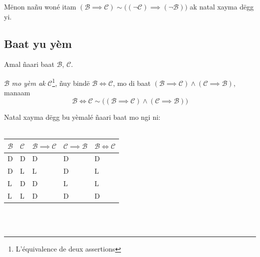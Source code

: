 \documentclass[twoside, a4paper]{article}
\begin{document}
Mënon nañu woné itam
$(\mathcal{B} \implies \mathcal{C}) \sim \big( (\neg\mathcal{C}) \implies (\neg \mathcal{B}) \big)$ ak natal xayma dëgg yi.

\subsection{Baat yu yèm}
\begin{tcolorbox}[enhanced jigsaw,breakable,pad at break*=1mm, colback=red!5!white,colframe=white!75!black,title= Téeki,
    watermark color=white]
  Amal ñaari baat $\mathcal{B}$, $\mathcal{C}$.

  $\mathcal{B}$ \textit{mo yèm ak} $\mathcal{C}$\footnote{L'équivalence de deux assertions}, ñuy bindë $\mathcal{B}\iff \mathcal{C} $, mo di baat $(\mathcal{B}\implies \mathcal{C}) \land (\mathcal{C}\implies \mathcal{B})$, manaam $$\mathcal{B}\iff \mathcal{C} \sim \big( (\mathcal{B}\implies \mathcal{C}) \land (\mathcal{C}\implies \mathcal{B})\big) $$

  Natal xayma dëgg bu yèmalé ñaari baat mo ngi ni:\\\\

  \begin{tabularx}{0.8\textwidth} {
      | >{\centering\arraybackslash}X
      | >{\centering\arraybackslash}X
      | >{\centering\arraybackslash}X
      | >{\centering\arraybackslash}X
      | >{\centering\arraybackslash}X |}
    \hline
    $\mathcal{B}$ & $\mathcal{C}$ & $\mathcal{B}\implies\mathcal{C}$ & $\mathcal{C}\implies\mathcal{B}$ & $\mathcal{B}\iff\mathcal{C}$ \\
    \hline
    D             & D             & D                                & D                                & D                            \\
    D             & L             & L                                & D                                & L                            \\
    L             & D             & D                                & L                                & L                            \\
    L             & L             & D                                & D                                & D                            \\
    \hline
  \end{tabularx}\\\\
\end{tcolorbox}
\end{document}
